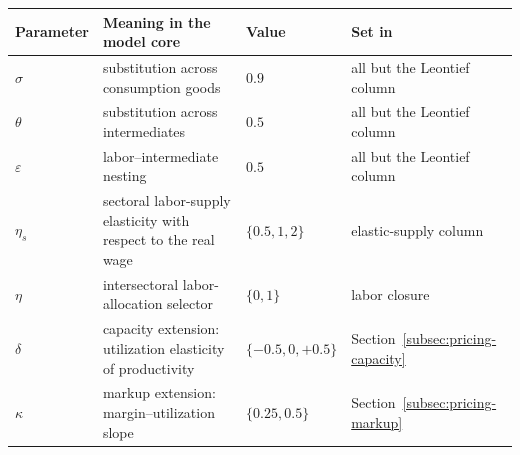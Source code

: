 \begin{table}[t]
\centering
\small
\begin{tabular}{@{}l p{5.9cm} l l@{}}
\toprule
Parameter & Meaning in the model core & Value & Set in \\
\midrule
$\sigma$ & substitution across consumption goods & $0.9$ & all but the Leontief column \\
$\theta$ & substitution across intermediates & $0.5$ & all but the Leontief column \\
$\varepsilon$ & labor--intermediate nesting & $0.5$ & all but the Leontief column \\
$\eta_s$ & sectoral labor-supply elasticity with respect to the real wage & $\{0.5,1,2\}$ & elastic-supply column \\
\addlinespace


$\eta$ & intersectoral labor-allocation selector & $\{0,1\}$ & labor closure \\
$\delta$ & capacity extension: utilization elasticity of productivity & $\{-0.5,0,+0.5\}$ & Section~\ref{subsec:pricing-capacity} \\
$\kappa$ & markup extension: margin--utilization slope & $\{0.25,0.5\}$ & Section~\ref{subsec:pricing-markup} \\


\end{tabular}
\end{table}
